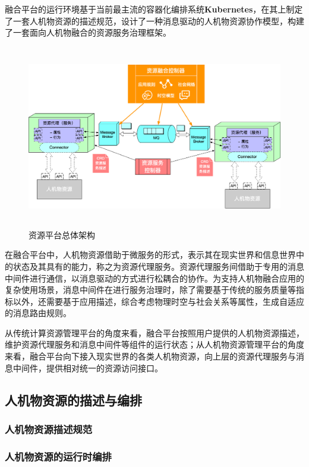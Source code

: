\documentclass[a4paper]{article}
\theoremstyle{definition}
\begin{document}
融合平台的运行环境基于当前最主流的容器化编排系统\textbf{Kubernetes}，在其上制定了一套人机物资源的描述规范，设计了一种消息驱动的人机物资源协作模型，构建了一套面向人机物融合的资源服务治理框架。

\begin{figure}[ht]
 \centering
 \includegraphics[height=8cm]{images/overview_arch.jpg}
 \caption{资源平台总体架构}
 \label{fig:singleblock}
\end{figure}

在融合平台中，人机物资源借助于微服务的形式，表示其在现实世界和信息世界中的状态及其具有的能力，称之为资源代理服务。资源代理服务间借助于专用的消息中间件进行通信，以消息驱动的方式进行松耦合的协作。为支持人机物融合应用的复杂使用场景，消息中间件在进行服务治理时，除了需要基于传统的服务质量等指标以外，还需要基于应用描述，综合考虑物理时空与社会关系等属性，生成自适应的消息路由规则。

从传统计算资源管理平台的角度来看，融合平台按照用户提供的人机物资源描述，维护资源代理服务和消息中间件等组件的运行状态；从人机物资源管理平台的角度来看，融合平台向下接入现实世界的各类人机物资源，向上层的资源代理服务与消息中间件，提供相对统一的资源访问接口。

\subsection{人机物资源的描述与编排}
\subsubsection{人机物资源描述规范}
\subsubsection{人机物资源的运行时编排}
\end{document}
